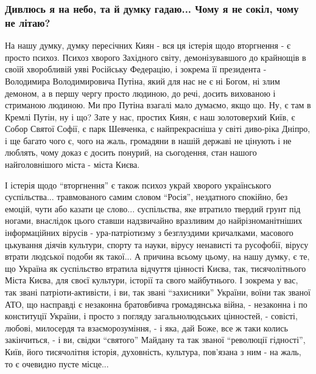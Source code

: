  
 
 
 
 

\clearpage
\subsubsection{Дивлюсь я на небо, та й думку гадаю... Чому я не сокіл, чому не
літаю?}

На нашу думку, думку пересічних Киян - вся ця істерія щодо вторгнення - є
просто психоз. Психоз хворого Західного світу, демонізувавшого до крайнощів в
своїй хворобливій уяві Російську Федерацію, і зокрема її президента -
Володимира Володимировича Путіна, який для нас не є ні Богом, ні злим демоном,
а в першу чергу просто людиною, до речі, досить вихованою і стриманою людиною.
Ми про Путіна взагалі мало думаємо, якщо що. Ну, є там в Кремлі Путін, ну і що?
Зате у нас, простих Киян, є наш золотоверхий Київ, є Собор Святої Софії, є парк
Шевченка, є найпрекрасніша у світі диво-ріка Дніпро, і ще багато чого є, чого
на жаль, громадяни в нашій державі не цінують і не люблять, чому доказ є досить
понурий, на сьогодення, стан нашого найголовнішого міста - міста Києва.

І істерія щодо \enquote{вторгнення} є також психоз украй хворого українського
суспільства... травмованого самим словом \enquote{Росія}, нездатного спокійно,
без емоцій, чути або казати це слово... суспільства, яке втратило твердий грунт
під ногами, внаслідок цього ставши надзвичайно вразливим до найрізноманітніших
інформаційних вірусів - ура-патріотизму з безглуздими кричалками, масового
цькування діячів культури, спорту та науки, вірусу ненависті та русофобії,
вірусу втрати людської подоби як такої... А причина всьому цьому, на нашу
думку, є те, що Україна як суспільство втратила відчуття цінності Києва, так,
тисячолітнього Міста Києва, для своєї культури, історії та свого майбутнього.
І зокрема у вас, так звані патріоти-активісти, і ви, так звані
\enquote{захисники} України, воїни так званої АТО, що насправді є незаконна
братовбивча громадянська війна, - незаконна і по конституції України, і просто
з погляду загальнолюдських цінностей, - совісті, любові, милосердя та
взаєморозуміння, - і яка, дай Боже, все ж таки колись закінчиться, - і ви,
свідки \enquote{святого} Майдану та так званої \enquote{революції гідності},
Київ, його тисячолітня історія, духовність, культура, пов'язана з ним - на
жаль, то є очевидно пусте місце...

